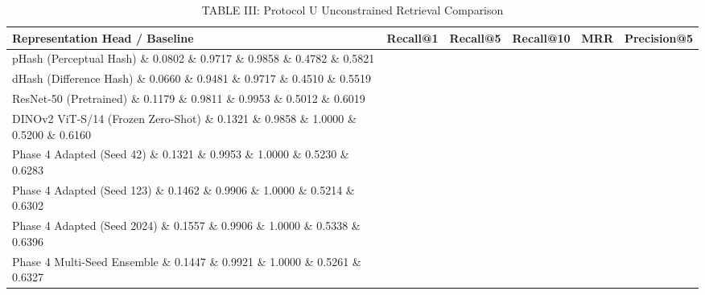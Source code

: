 \begin{table}[t]
\centering
\caption{TABLE III: Protocol U Unconstrained Retrieval Comparison}
\label{tab:table3_retrieval_comparison}
\begin{tabular}{lccccc}
\hline
\textbf{Representation Head / Baseline} & \textbf{Recall@1} & \textbf{Recall@5} & \textbf{Recall@10} & \textbf{MRR} & \textbf{Precision@5} \\
\hline
pHash (Perceptual Hash) \& 0.0802 \& 0.9717 \& 0.9858 \& 0.4782 \& 0.5821 \\
dHash (Difference Hash) \& 0.0660 \& 0.9481 \& 0.9717 \& 0.4510 \& 0.5519 \\
ResNet-50 (Pretrained) \& 0.1179 \& 0.9811 \& 0.9953 \& 0.5012 \& 0.6019 \\
DINOv2 ViT-S/14 (Frozen Zero-Shot) \& 0.1321 \& 0.9858 \& 1.0000 \& 0.5200 \& 0.6160 \\
Phase 4 Adapted (Seed 42) \& 0.1321 \& 0.9953 \& 1.0000 \& 0.5230 \& 0.6283 \\
Phase 4 Adapted (Seed 123) \& 0.1462 \& 0.9906 \& 1.0000 \& 0.5214 \& 0.6302 \\
Phase 4 Adapted (Seed 2024) \& 0.1557 \& 0.9906 \& 1.0000 \& 0.5338 \& 0.6396 \\
Phase 4 Multi-Seed Ensemble \& 0.1447 \& 0.9921 \& 1.0000 \& 0.5261 \& 0.6327 \\
\hline
\end{tabular}
\end{table}

